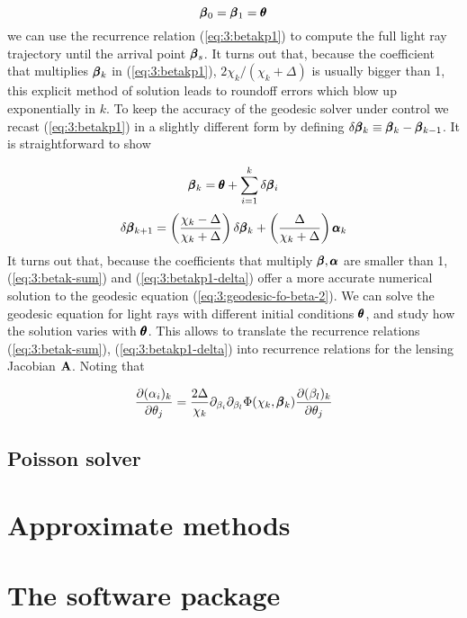 \begin{equation}
\label{eq:3:initcond}
\pmb{\beta}_0 = \pmb{\beta}_1 = \pmb{\theta} 
\end{equation}    
%
we can use the recurrence relation (\ref{eq:3:betakp1}) to compute the full light ray trajectory until the arrival point $\pmb{\beta}_s$. It turns out that, because the coefficient that multiplies $\pmb{\beta}_k$ in (\ref{eq:3:betakp1}), $2\chi_k/(\chi_k+\Delta)$ is usually bigger than 1, this explicit method of solution leads to roundoff errors which blow up exponentially in $k$. To keep the accuracy of the geodesic solver under control we recast (\ref{eq:3:betakp1}) in a slightly different form by defining $\delta\pmb{\beta}_k \equiv \pmb{\beta}_k-\pmb{\beta}_{k-1}$. It is straightforward to show

\begin{equation}
\label{eq:3:betak-sum}
\pmb{\beta}_k = \pmb{\theta} + \sum_{i=1}^k\delta\pmb{\beta}_i
\end{equation}
%
\begin{equation}
\label{eq:3:betakp1-delta}
\delta\pmb{\beta}_{k+1} = \left(\frac{\chi_k-\Delta}{\chi_k+\Delta}\right)\delta\pmb{\beta}_k + \left(\frac{\Delta}{\chi_k+\Delta}\right)\pmb{\alpha}_k
\end{equation} 
%
It turns out that, because the coefficients that multiply $\pmb{\beta},\pmb{\alpha}$ are smaller than 1, (\ref{eq:3:betak-sum}) and (\ref{eq:3:betakp1-delta}) offer a more accurate numerical solution to the geodesic equation (\ref{eq:3:geodesic-fo-beta-2}). We can solve the geodesic equation for light rays with different initial conditions $\pmb{\theta}$, and study how the solution varies with $\pmb{\theta}$. This allows to translate the recurrence relations (\ref{eq:3:betak-sum}), (\ref{eq:3:betakp1-delta}) into recurrence relations for the lensing Jacobian $\mathbf{A}$. Noting that 

\begin{equation}
\label{eq:3:Tk}
\frac{\partial (\alpha_i)_k}{\partial \theta_j} = \frac{2\Delta}{\chi_k}\partial_{\beta_i}\partial_{\beta_l}\Phi(\chi_k,\pmb{\beta}_k)\frac{\partial (\beta_l)_k}{\partial\theta_j}
\end{equation}

\subsection{Poisson solver}

\section{Approximate methods}

\section{The \LT software package}

